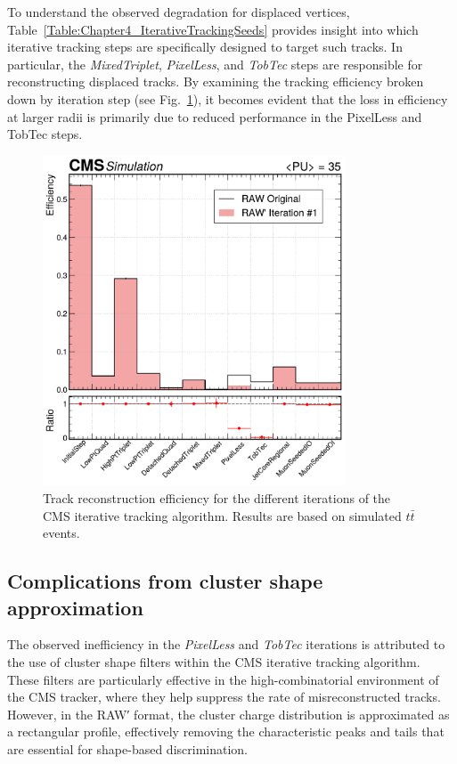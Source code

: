 To understand the observed degradation for displaced vertices, Table~\ref{Table:Chapter4_IterativeTrackingSeeds} provides insight into which iterative tracking steps are specifically designed to target such tracks. In particular, the \textit{MixedTriplet}, \textit{PixelLess}, and \textit{TobTec} steps are responsible for reconstructing displaced tracks. By examining the tracking efficiency broken down by iteration step (see Fig.~\ref{Figure:Chapter5_TrackingPerformance_bystep}), it becomes evident that the loss in efficiency at larger radii is primarily due to reduced performance in the PixelLess and TobTec steps.

\begin{figure}[h]
\centering
\includegraphics[width=0.8\textwidth]{Figures/Chapter5/efficiency_with_ratio.pdf}
\caption[Track reconstruction efficiency for the different iterations of the CMS iterative tracking algorithm.]{Track reconstruction efficiency for the different iterations of the CMS iterative tracking algorithm. Results are based on simulated $t\bar{t}$ events.}
\label{Figure:Chapter5_TrackingPerformance_bystep}
\end{figure}

\subsection{Complications from cluster shape approximation}

The observed inefficiency in the \textit{PixelLess} and \textit{TobTec} iterations is attributed to the use of cluster shape filters within the CMS iterative tracking algorithm. These filters are particularly effective in the high-combinatorial environment of the CMS tracker, where they help suppress the rate of misreconstructed tracks. However, in the RAW′ format, the cluster charge distribution is approximated as a rectangular profile, effectively removing the characteristic peaks and tails that are essential for shape-based discrimination.

